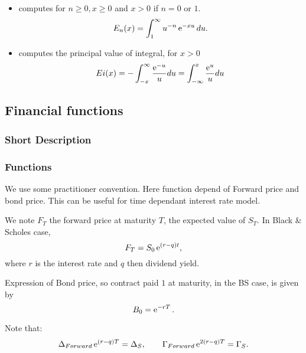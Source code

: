 \begin{itemize}
\item {}
  \sshortdescribe   computes for  $ n\geq 0, x \geq 0$ and $x>0$ if $n=0$ or $1$.
  \begin{equation*}
    E_n(x)= \int_1^{\infty} u^{-n} \operatorname{e}^{ -x u } du.
  \end{equation*}
\item {}
  \sshortdescribe   computes the principal value of integral, for $x>0$ 
  \begin{equation*}
    Ei(x) = - \int_{-x}^{\infty} \frac{\operatorname{e}^{ -u }}{u} du = \int_{-\infty}^x \frac{\operatorname{e}^{ u }}{u} du 
  \end{equation*}
\end{itemize}




\subsection{Financial functions}
\subsubsection{Short Description}
\subsubsection{Functions}

We use some practitioner convention. Here function depend of Forward price
and bond price. This can be useful for time dependant interest rate model.

We note $F_T$ the forward price at maturity $T$, the expected value of $S_T$.
In Black \& Scholes case, 
$$ F_T = S_0 \operatorname{e}^{ (r-q)t }, $$
where $r$ is the interest rate and $q$ then dividend yield.

Expression of Bond price, so contract paid $1$ at maturity, in the BS case, 
is given by
$$ B_0 = \operatorname{e}^{ -r T }.$$

Note that:
$$ \Delta_{Forward}  \operatorname{e}^{ (r-q)T } = \Delta_{S}, \quad \quad
\Gamma_{Forward}  \operatorname{e}^{ 2 (r-q)T } = \Gamma_{S}.$$

